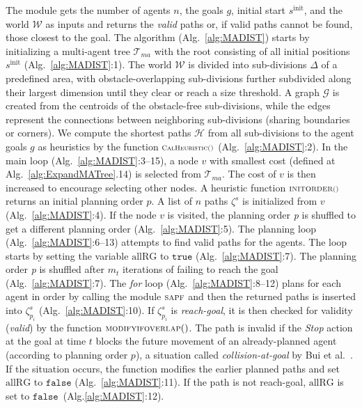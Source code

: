 \documentclass[letterpaper, 10 pt, conference]{ieeeconf}  %
\newcommand{\Acronym}[1]{\ensuremath{{{\texttt{#1}}}}}
\newcommand{\Symbol}[1]{\ensuremath{\mathcal{#1}}}
\newcommand{\Function}[1]{\ensuremath{{\scriptstyle{{\textsc{#1}}}}}}
\newcommand{\Var}[1]{\ensuremath{{{\mathrm{#1}}}}}
\newcommand{\False}{\ensuremath{\Acronym{false}}}
\newcommand{\True}{\ensuremath{\Acronym{true}}}
\newcommand{\Subdiv}{\ensuremath{\Delta}}
\newcommand{\World}{\Symbol{W}}
\newcommand{\Traj}{\ensuremath{\zeta}}
\newcommand{\Tree}{\Symbol{T}}
\begin{document}
The module gets the number of agents $n$, the goals $g$, initial start $s^\text{init}$, 
and the world $\World$ as inputs and returns the \textit{valid} paths or, if valid paths 
cannot be found, those closest to the goal. 
The algorithm (Alg.~\ref{alg:MADIST}) starts by initializing a multi-agent tree 
$\Tree_{ma}$ with the root consisting of all initial positions $s^\text{init}$ 
(Alg.~\ref{alg:MADIST}:1). 
The world $\World$ is divided into sub-divisions $\Subdiv$ of a predefined area, with 
obstacle-overlapping sub-divisions further subdivided 
along their largest dimension until they clear or reach a size threshold.
A graph $\mathcal{G}$ is created from the centroids of the obstacle-free sub-divisions, 
while the edges represent the  
connections between neighboring sub-divisions (sharing boundaries or corners).
We compute the shortest paths $\mathcal{H}$ from all sub-divisions to the agent goals $g$ 
as heuristics by the function $\Function{CalHeuristic()}$ (Alg.~\ref{alg:MADIST}:2).
In the main loop (Alg.~\ref{alg:MADIST}:3--15), a node $v$ with smallest cost 
(defined at Alg.~\ref{alg:ExpandMATree}.14) is selected from $\Tree_{ma}$. The cost of $v$ is 
then increased to encourage selecting other nodes.
A heuristic function $\Function{INITORDER()}$ returns an initial planning order $p$. 
A list of $n$ paths $\Traj^s$ is initialized from $v$ (Alg.~\ref{alg:MADIST}:4). 
If the node $v$ is visited, the planning order \emph{p} is shuffled to get a different 
planning order (Alg.~\ref{alg:MADIST}:5).
The planning loop (Alg.~\ref{alg:MADIST}:6--13) attempts to find valid paths 
for the agents.
The loop starts by setting the variable $\Var{allRG}$ to $\True$ (Alg.~\ref{alg:MADIST}:7).
The planning order \emph{p} is shuffled after $m_t$ iterations of failing to 
reach the goal (Alg.~\ref{alg:MADIST}:7). 
The \emph{for} loop (Alg.~\ref{alg:MADIST}:8--12) plans for each agent in order 
by calling the module $\Function{SAPF}$ and then the returned paths is inserted 
into $\Traj^s_{p_i}$ (Alg.~\ref{alg:MADIST}:10). If $\Traj^s_{p_i}$ is \textit{reach-goal},
it is then checked for validity (\textit{valid}) by the function $\Function{MODIFYIFOVERLAP}()$. 
The path is invalid if the \textit{Stop} action at the goal at time $t$ blocks 
the future movement of an already-planned agent (according to planning order $p$), 
a situation called \textit{collision-at-goal} by Bui et al.~\cite{bui2024multi}.
If the situation occurs, the function modifies the earlier planned paths and 
set $\Var{allRG}$ to $\False$ (Alg.~\ref{alg:MADIST}:11). 
If the path is not reach-goal, $\Var{allRG}$ is set to $\False$~(Alg.\ref{alg:MADIST}:12). 
\end{document}
